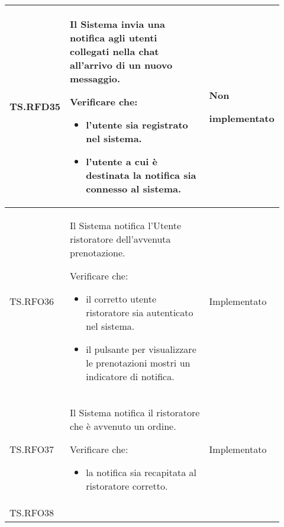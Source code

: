 \begin{longtable}{|p{0.10\linewidth}|p{0.70\linewidth}|p{0.12\linewidth}|}
	\hline
	TS.RFD35                                                                                                                        &
	Il Sistema invia una notifica agli utenti collegati nella chat all'arrivo di un nuovo messaggio. \par
	Verificare che:
	\begin{itemize}
		\item l'utente sia registrato nel sistema.
		\item l'utente a cui è destinata la notifica sia connesso al sistema.
	\end{itemize}                                                           &
	Non \par implementato                                                                                                                                                   \\
	\hline
	TS.RFO36                                                                                                                        &
	Il Sistema notifica l'Utente ristoratore dell'avvenuta prenotazione.  \par
	Verificare che:
	\begin{itemize}
		\item il corretto utente ristoratore sia autenticato nel sistema.
		\item il pulsante per visualizzare le prenotazioni mostri un indicatore di notifica.
	\end{itemize}                                            &
	Implementato                                                                                                                                                            \\
	\hline
	TS.RFO37                                                                                                                        &
	Il Sistema notifica il ristoratore che è avvenuto un ordine.   \par
	Verificare che:
	\begin{itemize}
		\item la notifica sia recapitata al ristoratore corretto.
	\end{itemize}                                                                       &
	Implementato                                                                                                                                                            \\
	\hline
	TS.RFO38                                                                                                                        &

\end{longtable}
